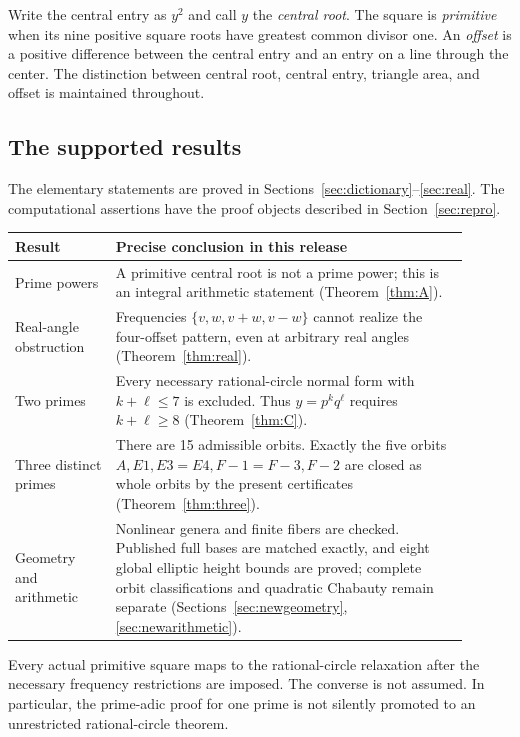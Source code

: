 \documentclass[11pt,letterpaper]{article}
\theoremstyle{definition}\newtheorem{definition}[theorem]{Definition}
\theoremstyle{remark}\newtheorem{remark}[theorem]{Remark}
\begin{document}
Write the central entry as $y^2$ and call $y$ the \emph{central root}. The square is \emph{primitive} when its nine positive square roots have greatest common divisor one. An \emph{offset} is a positive difference between the central entry and an entry on a line through the center. The distinction between central root, central entry, triangle area, and offset is maintained throughout.

\subsection*{The supported results}
The elementary statements are proved in Sections~\ref{sec:dictionary}--\ref{sec:real}. The computational assertions have the proof objects described in Section~\ref{sec:repro}.
\begin{center}
\small
\begin{tabular}{>{\raggedright\arraybackslash}m{0.20\linewidth}m{0.70\linewidth}}
\toprule
Result & Precise conclusion in this release\\
\midrule
Prime powers & A primitive central root is not a prime power; this is an integral arithmetic statement (Theorem~\ref{thm:A}).\\
Real-angle obstruction & Frequencies $\{v,w,v+w,v-w\}$ cannot realize the four-offset pattern, even at arbitrary real angles (Theorem~\ref{thm:real}).\\
Two primes & Every necessary rational-circle normal form with $k+\ell\le7$ is excluded. Thus $y=p^kq^\ell$ requires $k+\ell\ge8$ (Theorem~\ref{thm:C}).\\
Three distinct primes & There are 15 admissible orbits. Exactly the five orbits $A,E1,E3=E4,F{-}1=F{-}3,F{-}2$ are closed as whole orbits by the present certificates (Theorem~\ref{thm:three}).\\
Geometry and arithmetic & Nonlinear genera and finite fibers are checked. Published full bases are matched exactly, and eight global elliptic height bounds are proved; complete orbit classifications and quadratic Chabauty remain separate (Sections~\ref{sec:newgeometry}, \ref{sec:newarithmetic}).\\
\bottomrule
\end{tabular}
\end{center}

Every actual primitive square maps to the rational-circle relaxation after the necessary frequency restrictions are imposed. The converse is not assumed. In particular, the prime-adic proof for one prime is not silently promoted to an unrestricted rational-circle theorem.
\end{document}
